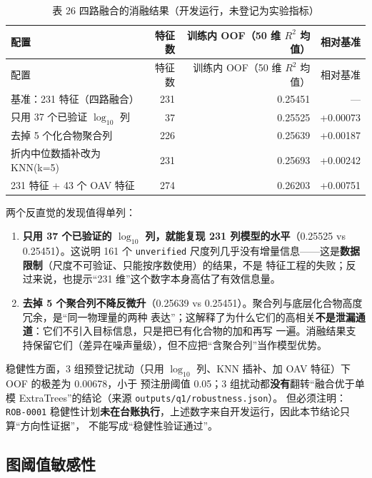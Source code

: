 \documentclass[
  a4paper,12pt]{article}
\providecommand{\tightlist}{%
  \setlength{\itemsep}{0pt}\setlength{\parskip}{0pt}}
\begin{document}
\begin{longtable}[]{@{}lrrr@{}}
\caption{表 26
四路融合的消融结果（开发运行，未登记为实验指标）}\tabularnewline
\toprule\noalign{}
配置 & 特征数 & 训练内 OOF（50 维 \(R^2\) 均值） & 相对基准 \\
\midrule\noalign{}
\endfirsthead
\toprule\noalign{}
配置 & 特征数 & 训练内 OOF（50 维 \(R^2\) 均值） & 相对基准 \\
\midrule\noalign{}
\endhead
\bottomrule\noalign{}
\endlastfoot
基准：231 特征（四路融合） & 231 & 0.25451 & --- \\
只用 37 个已验证 \(\log_{10}\) 列 & 37 & 0.25525 & +0.00073 \\
去掉 5 个化合物聚合列 & 226 & 0.25639 & +0.00187 \\
折内中位数插补改为 KNN(k=5) & 231 & 0.25693 & +0.00242 \\
231 特征 + 43 个 OAV 特征 & 274 & 0.26203 & +0.00751 \\
\end{longtable}

两个反直觉的发现值得单列：

\begin{enumerate}
\def\labelenumi{\arabic{enumi}.}
\tightlist
\item
  \textbf{只用 37 个已验证的 \(\log_{10}\) 列，就能复现 231
  列模型的水平}（0.25525 vs 0.25451）。这说明 161 个 \texttt{unverified}
  尺度列几乎没有增量信息------这是\textbf{数据限制}（尺度不可验证、只能按序数使用）的结果，不是
  特征工程的失败；反过来说，也提示``231
  维''这个数字本身高估了有效信息量。
\item
  \textbf{去掉 5 个聚合列不降反微升}（0.25639 vs
  0.25451）。聚合列与底层化合物高度冗余，是``同一物理量的两种
  表达''；这解释了为什么它们的高相关\textbf{不是泄漏通道}：它们不引入目标信息，只是把已有化合物的加和再写
  一遍。消融结果支持保留它们（差异在噪声量级），但不应把``含聚合列''当作模型优势。
\end{enumerate}

稳健性方面，3 组预登记扰动（只用 \(\log_{10}\) 列、KNN 插补、加 OAV
特征）下 OOF 的极差为 0.00678，小于 预注册阈值 0.05；3
组扰动都\textbf{没有}翻转``融合优于单模 ExtraTrees''的结论（来源
\texttt{outputs/q1/robustness.json}）。 但必须注明：\texttt{ROB-0001}
稳健性计划\textbf{未在台账执行}，上述数字来自开发运行，因此本节结论只算``方向性证据''，
不能写成``稳健性验证通过''。

\subsection{图阈值敏感性}\label{ux56feux9608ux503cux654fux611fux6027}
\end{document}
